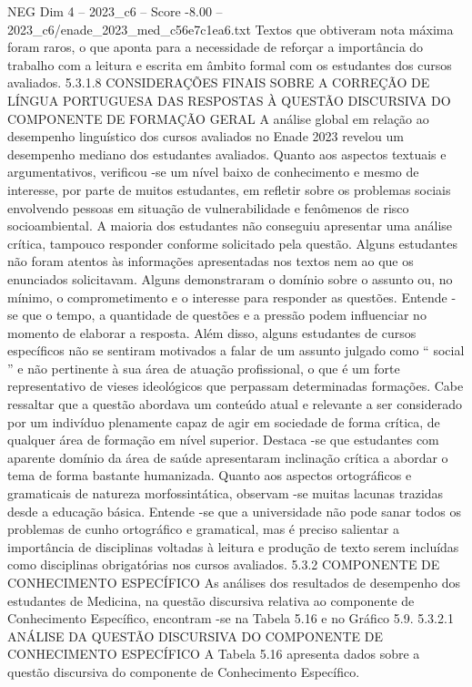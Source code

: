 \begin{textsample}{NEG Dim 4 – 2023\_c6 – Score -8.00 – 2023\_c6/enade\_2023\_med\_c56e7c1ea6.txt}
Textos que obtiveram nota máxima foram raros, o que aponta para a necessidade de reforçar a importância do trabalho com a leitura e escrita em âmbito formal com os estudantes dos cursos avaliados. 5.3.1.8 CONSIDERAÇÕES FINAIS SOBRE A CORREÇÃO DE LÍNGUA PORTUGUESA DAS RESPOSTAS À QUESTÃO DISCURSIVA DO COMPONENTE DE FORMAÇÃO GERAL A análise global em relação ao desempenho linguístico dos cursos avaliados no Enade 2023 revelou um desempenho mediano dos estudantes avaliados.
Quanto aos aspectos textuais e argumentativos, verificou -se um nível baixo de conhecimento e mesmo de interesse, por parte de muitos estudantes, em refletir sobre os problemas sociais envolvendo pessoas em situação de vulnerabilidade e fenômenos de risco socioambiental.
A maioria dos estudantes não conseguiu apresentar uma análise crítica, tampouco responder conforme solicitado pela questão.
Alguns estudantes não foram atentos às informações apresentadas nos textos nem ao que os enunciados solicitavam.
Alguns demonstraram o domínio sobre o assunto ou, no mínimo, o comprometimento e o interesse para responder as questões.
Entende -se que o tempo, a quantidade de questões e a pressão podem influenciar no momento de elaborar a resposta.
Além disso, alguns estudantes de cursos específicos não se sentiram motivados a falar de um assunto julgado como “ social ” e não pertinente à sua área de atuação profissional, o que é um forte representativo de vieses ideológicos que perpassam determinadas formações.
Cabe ressaltar que a questão abordava um conteúdo atual e relevante a ser considerado por um indivíduo plenamente capaz de agir em sociedade de forma crítica, de qualquer área de formação em nível superior.
Destaca -se que estudantes com aparente domínio da área de saúde apresentaram inclinação crítica a abordar o tema de forma bastante humanizada.
Quanto aos aspectos ortográficos e gramaticais de natureza morfossintática, observam -se muitas lacunas trazidas desde a educação básica.
Entende -se que a universidade não pode sanar todos os problemas de cunho ortográfico e gramatical, mas é preciso salientar a importância de disciplinas voltadas à leitura e produção de texto serem incluídas como disciplinas obrigatórias nos cursos avaliados. 5.3.2 COMPONENTE DE CONHECIMENTO ESPECÍFICO As análises dos resultados de desempenho dos estudantes de Medicina, na questão discursiva relativa ao componente de Conhecimento Específico, encontram -se na Tabela 5.16 e no Gráfico 5.9. 5.3.2.1 ANÁLISE DA QUESTÃO DISCURSIVA DO COMPONENTE DE CONHECIMENTO ESPECÍFICO A Tabela 5.16 apresenta dados sobre a questão discursiva do componente de Conhecimento Específico.

\end{textsample}
